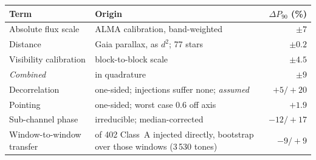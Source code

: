 \begin{tabular}{@{}l@{~}>{\raggedright\arraybackslash}p{}@{~}r@{}}
\hline
Term & Origin & $\Delta P_{90}$ (\%) \\
\hline
Absolute flux scale & ALMA calibration, band-weighted & $\pm7$ \\
Distance & Gaia parallax, as $d^{2}$; 77 stars & $\pm0.2$ \\
Visibility calibration & block-to-block scale & $\pm4.5$ \\
\hline
\emph{Combined} & in quadrature & $\pm9$ \\
\hline
Decorrelation & one-sided; injections suffer none; \emph{assumed} & $+5/+20$ \\
Pointing & one-sided; worst case 0.6\arcsec{} off axis & $+1.9$ \\
Sub-channel phase & irreducible; median-corrected & $-12/+17$ \\
Window-to-window transfer & 49 of 402 Class~A injected directly, bootstrap over those windows (3\,530 tones) & $-9/+9$ \\
\hline
\end{tabular}

